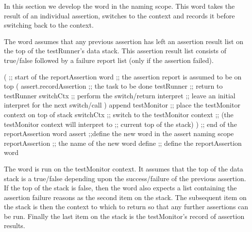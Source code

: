 In this section we develop the  word in the 
 naming scope. This word takes the result of an individual 
assertion, switches to the  context and records it 
before switching back to the  context. 

The  word assumes that any previous assertion has 
left an assertion result list on the top of the testRunner's data stack. 
This assertion result list consists of true/false followed by a failure 
report list (only if the assertion failed). 

\startJoylolCode
(               ;; start of the reportAssertion word
                ;; the assertion report is assumed to be on top
  (
    assert.recordAssertion  ;; the task to be done
    testRunner  ;; return to testRunner
    switchCtx   ;; perform the switch/return
    interpret   ;; leave an initial interpret for the next switch/call
  )
  append
  testMonitor   ;; place the testMonitor context on top of stack
  switchCtx     ;; switch to the testMonitor context
                ;; (the testMonitor context will interpret to
                ;;  current top of the stack)
)               ;; end of the reportAssertion word
assert          ;;define the new word in the assert naming scope
reportAssertion ;; the name of the new word
define          ;; define the reportAssertion word
\stopJoylolCode
\stopTestSuite


The  word is run on the testMonitor context. It 
assumes that the top of the data stack is a true/false depending upon the 
success/failure of the previous assertion. If the top of the stack is 
false, then the  word also expects a list containing 
the assertion failure reasons as the second item on the stack. The 
subsequent item on the stack is then the context to which to return so 
that any further assertions can be run. Finally the last item on the stack 
is the testMonitor's record of assertion results. 

